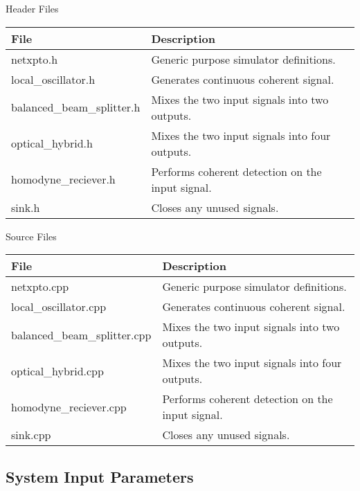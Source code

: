 \documentclass[../../sdf/tex/cv_system]{subfiles}
\begin{document}
Header Files
\begin{table}[H]
\centering
\begin{tabulary}{1.0\textwidth}{|L|L|}
\hline
\textbf{File}              & \textbf{Description} 				            \\ \hline
netxpto.h                  & Generic purpose simulator definitions.	        \\ \hline
local\_oscillator.h        & Generates continuous coherent signal.            \\ \hline
balanced\_beam\_splitter.h & Mixes the two input signals into two outputs.    \\ \hline
optical\_hybrid.h          & Mixes the two input signals into four outputs.   \\ \hline
homodyne\_reciever.h       & Performs coherent detection on the input signal. \\ \hline
sink.h                     & Closes any unused signals.                       \\ \hline
\end{tabulary}
\end{table}
%
Source Files
\begin{table}[H]
\centering
\begin{tabulary}{1.0\textwidth}{|L|L|}
\hline
\textbf{File}                & \textbf{Description} 					          \\ \hline
netxpto.cpp                  & Generic purpose simulator definitions.	          \\ \hline
local\_oscillator.cpp        & Generates continuous coherent signal.            \\ \hline
balanced\_beam\_splitter.cpp & Mixes the two input signals into two outputs.    \\ \hline
optical\_hybrid.cpp          & Mixes the two input signals into four outputs.   \\ \hline
homodyne\_reciever.cpp       & Performs coherent detection on the input signal. \\ \hline
sink.cpp                     & Closes any unused signals.                       \\ \hline
\end{tabulary}
\end{table}


\subsection{System Input Parameters}
\end{document}

